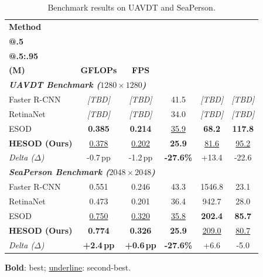\begin{table}[t]
\centering
\caption{Benchmark results on UAVDT and SeaPerson.}
\label{tab:main_results}
\scriptsize
\setlength{\tabcolsep}{3.5pt}
\begin{tabular*}{\columnwidth}{@{\extracolsep{\fill}}lccccc@{}}
\toprule
\textbf{Method} & \shortstack{\textbf{mAP}\\\textbf{@.5}} & \shortstack{\textbf{mAP}\\\textbf{@.5:.95}} & \shortstack{\textbf{Params}\\\textbf{(M)}} & \textbf{GFLOPs} & \textbf{FPS} \\
\midrule
\multicolumn{6}{l}{\textit{\textbf{UAVDT Benchmark ($1280\times 1280$)}}} \\
\midrule
Faster R-CNN~\cite{FasterRCNN} & \textit{[TBD]} & \textit{[TBD]} & 41.5 & \textit{[TBD]} & \textit{[TBD]} \\
RetinaNet~\cite{RetinaNet}       & \textit{[TBD]} & \textit{[TBD]} & 34.0 & \textit{[TBD]} & \textit{[TBD]} \\
ESOD~\cite{ESOD}                 & \textbf{0.385} & \textbf{0.214} & \underline{35.9} & \textbf{68.2} & \textbf{117.8} \\
\textbf{HESOD (Ours)}            & \underline{0.378} & \underline{0.202} & \textbf{25.9} & \underline{81.6} & \underline{95.2} \\
\midrule
\textit{Delta ($\Delta$)}        & -0.7\,pp & -1.2\,pp & \textbf{-27.6\%} & +13.4 & -22.6 \\
\midrule
\multicolumn{6}{l}{\textit{\textbf{SeaPerson Benchmark ($2048\times 2048$)}}} \\
\midrule
Faster R-CNN~\cite{FasterRCNN} & 0.551 & 0.246 & 43.3 & 1546.8 & 23.1 \\
RetinaNet~\cite{RetinaNet}       & 0.473 & 0.201 & 36.4 & 942.7 & 28.0 \\
ESOD~\cite{ESOD}                 & \underline{0.750} & \underline{0.320} & \underline{35.8} & \textbf{202.4} & \textbf{85.7} \\
\textbf{HESOD (Ours)}            & \textbf{0.774} & \textbf{0.326} & \textbf{25.9} & \underline{209.0} & \underline{80.7} \\
\midrule
\textit{Delta ($\Delta$)}        & \textbf{+2.4\,pp} & \textbf{+0.6\,pp} & \textbf{-27.6\%} & +6.6 & -5.0 \\
\bottomrule
\end{tabular*}
\vspace{0.8mm}
\parbox{\columnwidth}{\scriptsize \textbf{Bold}: best; \underline{underline}: second-best.}
\end{table}


